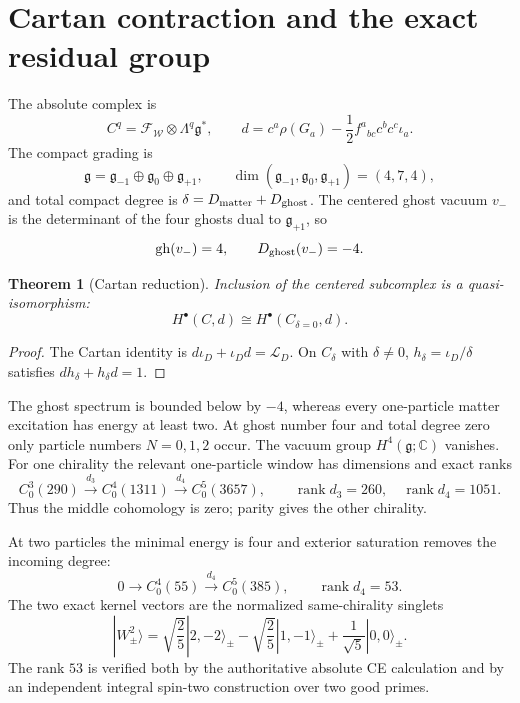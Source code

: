 \documentclass[11pt]{article}
\newtheorem{theorem}{Theorem}[section]
\theoremstyle{remark}
\newcommand{\C}{\mathbb C}
\newcommand{\g}{\mathfrak g}
\newcommand{\W}{\mathcal W}
\newcommand{\F}{\mathcal F}
\newcommand{\rank}{\operatorname{rank}}
\begin{document}
\section{Cartan contraction and the exact residual group}

The absolute complex is
\begin{equation}\label{eq:CE}
 C^q=\F_{\W}\otimes\Lambda^q\g^*,
 \qquad
 d=c^a\rho(G_a)-\frac12f^a{}_{bc}c^bc^c\iota_a.
\end{equation}
The compact grading is
\begin{equation}
 \g=\g_{-1}\oplus\g_0\oplus\g_{+1},
 \qquad \dim(\g_{-1},\g_0,\g_{+1})=(4,7,4),
\end{equation}
and total compact degree is
$\delta=D_{\rm matter}+D_{\rm ghost}$.  The centered ghost vacuum $v_-$ is
the determinant of the four ghosts dual to $\g_{+1}$, so
\begin{equation}\label{eq:centered}
 \operatorname{gh}(v_-)=4,
 \qquad D_{\rm ghost}(v_-)=-4.
\end{equation}

\begin{theorem}[Cartan reduction]\label{thm:cartan-a}
Inclusion of the centered subcomplex is a quasi-isomorphism:
\begin{equation}\label{eq:cartan-a}
 H^\bullet(C,d)\cong H^\bullet(C_{\delta=0},d).
\end{equation}
\end{theorem}

\begin{proof}
The Cartan identity is
$d\iota_D+\iota_Dd=\mathcal L_D$.  On $C_\delta$ with $\delta\ne0$,
$h_\delta=\iota_D/\delta$ satisfies $dh_\delta+h_\delta d=1$.
\end{proof}

The ghost spectrum is bounded below by $-4$, whereas every one-particle
matter excitation has energy at least two.  At ghost number four and total
degree zero only particle numbers $N=0,1,2$ occur.  The vacuum group
$H^4(\g;\C)$ vanishes.  For one chirality the relevant one-particle window
has dimensions and exact ranks
\begin{equation}\label{eq:one-ranks}
 C^3_0(290)\xrightarrow{d_3}C^4_0(1311)
 \xrightarrow{d_4}C^5_0(3657),
 \qquad \rank d_3=260,
 \quad \rank d_4=1051.
\end{equation}
Thus the middle cohomology is zero; parity gives the other chirality.

At two particles the minimal energy is four and exterior saturation removes
the incoming degree:
\begin{equation}\label{eq:two-ranks}
 0\longrightarrow C^4_0(55)\xrightarrow{d_4}C^5_0(385),
 \qquad \rank d_4=53.
\end{equation}
The two exact kernel vectors are the normalized same-chirality singlets
\begin{equation}\label{eq:Wstates}
 |W_\pm^2\rangle
 =\sqrt{\frac25}|2,-2\rangle_\pm
 -\sqrt{\frac25}|1,-1\rangle_\pm
 +\frac1{\sqrt5}|0,0\rangle_\pm.
\end{equation}
The rank $53$ is verified both by the authoritative absolute CE calculation
and by an independent integral spin-two construction over two good primes.
\end{document}
